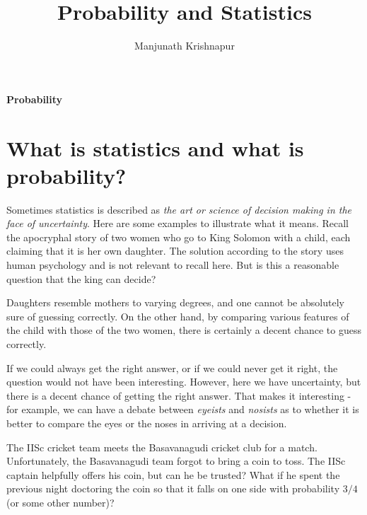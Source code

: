 \documentclass[preprint,  11pt]{amsart}
\begin{document}
\title{Probability and Statistics}
\author{Manjunath Krishnapur}

\maketitle

 \tableofcontents

\newpage

\maketitle

\setcounter{page}{4}



\newpage
\vspace*{\fill}
\begin{center}
\Huge {\bf Probability}
\end{center}
\vspace*{\fill}
\newpage

\section{What is statistics and what is probability?}
Sometimes statistics is described as {\em the art or science of decision making in the face of uncertainty}.  Here are some examples to illustrate what it means.
\beg Recall the apocryphal story of two women who go to King Solomon with a child, each claiming that it is her own daughter. The solution according to the story uses human psychology and is not relevant to recall here. But is this a reasonable question that the king can decide?

Daughters resemble mothers to varying degrees, and one cannot be absolutely sure of guessing correctly.
 On the other hand, by comparing various features of the child with those of the two women, there is certainly a decent chance to guess correctly.

  If we could always get the right answer, or if we could never get it right, the question would not have been interesting. However, here we have uncertainty, but there is a decent chance of getting the right answer. That makes it interesting - for example, we can have a debate between {\em eyeists}  and {\em nosists} as to whether it is better to compare the eyes or the noses in arriving at a decision.
\eeg

\beg The IISc cricket team meets the Basavanagudi cricket club for a match. Unfortunately, the Basavanagudi team forgot to bring a coin to toss. The IISc captain helpfully offers his coin, but can he be trusted? What if he spent the previous night doctoring the coin so that it falls on one side with probability $3/4$ (or some other number)?
\end{document}
